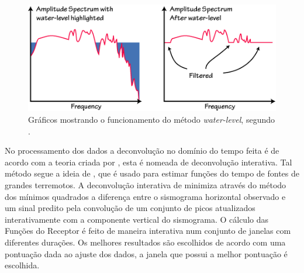 \begin{figure}[!ht]
\centering
\includegraphics[scale=0.8]{Figs/water_level.png}
\caption{Gráficos mostrando o funcionamento do método \textit{water-level}, segundo \cite{Ammon_waterlevel_1997}.}
\label{water_level}
\end{figure}

No processamento dos dados a deconvolução no domínio do tempo feita é de acordo com a teoria criada por \cite{ligorria_iterative_1999}, esta é nomeada de deconvolução interativa. Tal método segue a ideia de \cite{kikuchi_inversion_1982}, que é usado para estimar funções do tempo de fontes de grandes terremotos. A deconvolução interativa de  \cite{ligorria_iterative_1999} minimiza através do método dos mínimos quadrados a diferença entre o sismograma horizontal observado e um sinal predito pela convolução de um conjunto de picos atualizados interativamente com a componente vertical do sismograma. O cálculo das Funções do Receptor é feito de maneira interativa num conjunto de janelas com diferentes durações. Os melhores resultados são escolhidos de acordo com uma pontuação dada ao ajuste dos dados, a janela que possui a melhor pontuação é escolhida.


